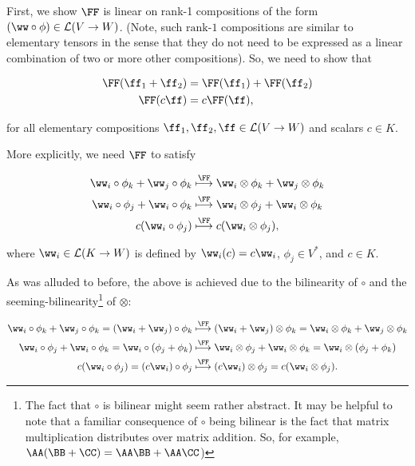 First, we show $\FF$ is linear on rank-1 compositions of the form $(\ww \circ \phi) \in \LLLL(V \rightarrow W)$. (Note, such ${\text{rank-1}}$ compositions are similar to elementary tensors in the sense that they do not need to be expressed as a linear combination of two or more other compositions). So, we need to show that

\begin{align*}
    \FF(\ff_1 + \ff_2) &= \FF(\ff_1) + \FF(\ff_2) \\
    \FF(c\ff) &= c\FF(\ff),
\end{align*}

for all elementary compositions $\ff_1, \ff_2, \ff \in \LLLL(V \rightarrow W)$ and scalars $c \in K$.

More explicitly, we need $\FF$ to satisfy

\begin{align*}
    \ww_i \circ \phi_k + \ww_j \circ \phi_k 
    &\overset{\FF}{\longmapsto}
    \ww_i \otimes \phi_k + \ww_j \otimes \phi_k
    \\
    \ww_i \circ \phi_j + \ww_i \circ \phi_k 
    &\overset{\FF}{\longmapsto}
    \ww_i \otimes \phi_j + \ww_i \otimes \phi_k
    \\
    c (\ww_i \circ \phi_j)
    &\overset{\FF}{\longmapsto}
    c (\ww_i \otimes \phi_j),
\end{align*}

where $\ww_i \in \LLLL(K \rightarrow W)$ is defined by $\ww_i(c) = c \ww_i$, $\phi_j \in V^*$, and $c \in K$.

As was alluded to before, the above is achieved due to the bilinearity of $\circ$ and the seeming-bilinearity\footnote{The fact that $\circ$ is bilinear might seem rather abstract. It may be helpful to note that a familiar consequence of $\circ$ being bilinear is the fact that matrix multiplication distributes over matrix addition. So, for example, $\AA(\BB + \CC) = \AA \BB + \AA \CC$)} of $\otimes$:

\begin{align*}
    \ww_i \circ \phi_k + \ww_j \circ \phi_k 
    = (\ww_i + \ww_j) \circ \phi_k
    &\overset{\FF}{\longmapsto}
    (\ww_i + \ww_j) \otimes \phi_k = \ww_i \otimes \phi_k + \ww_j \otimes \phi_k
    \\
    \ww_i \circ \phi_j + \ww_i \circ \phi_k 
    = \ww_i \circ (\phi_j + \phi_k)
    &\overset{\FF}{\longmapsto}
    \ww_i \otimes \phi_j + \ww_i \otimes \phi_k
    = \ww_i \otimes (\phi_j + \phi_k)
    \\
    c (\ww_i \circ \phi_j)
    = (c \ww_i) \circ \phi_j
    &\overset{\FF}{\longmapsto}
    (c \ww_i) \otimes \phi_j
    = c (\ww_i \otimes \phi_j).
\end{align*}

